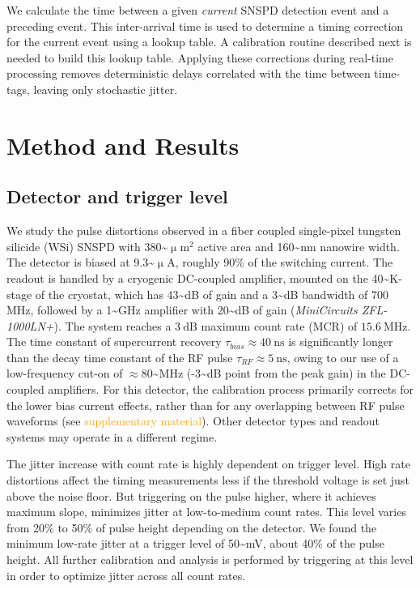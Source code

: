 \documentclass[11pt]{caltech_thesis} %
\begin{document}
We calculate the time between a given \emph{current} SNSPD detection
event and a preceding event. This inter-arrival time is used to
determine a timing correction for the current event using a lookup
table. A calibration routine described next is needed to build this
lookup table. Applying these corrections during real-time processing
removes deterministic delays correlated with the time between time-tags,
leaving only stochastic jitter.

\hypertarget{method-and-results}{%
\section{Method and Results}\label{method-and-results}}

\hypertarget{detector-and-trigger-level}{%
\subsection{Detector and trigger
level}\label{detector-and-trigger-level}}

We study the pulse distortions observed in a fiber coupled single-pixel
tungsten silicide (WSi) SNSPD with
380\textasciitilde{}$\mathrm{\upmu m^2}$ active area and
160\textasciitilde nm nanowire width. The detector is biased at
9.3\textasciitilde{}$\mathrm{\upmu A}$, roughly 90\% of the switching
current. The readout is handled by a cryogenic DC-coupled amplifier,
mounted on the 40\textasciitilde K-stage of the cryostat, which has
43\textasciitilde dB of gain and a 3\textasciitilde dB bandwidth of 700
MHz, followed by a 1\textasciitilde GHz amplifier with
20\textasciitilde dB of gain (\emph{MiniCircuits ZFL-1000LN+}). The
system reaches a $3~\mathrm{dB}$ maximum count rate (MCR) of
$15.6~\mathrm{MHz}$. The time constant of supercurrent recovery
$\tau_{bias} \approx 40~\mathrm{ns}$ is significantly longer than the
decay time constant of the RF pulse $\tau_{RF} \approx 5~\mathrm{ns}$,
owing to our use of a low-frequency cut-on of
$\approx 80$\textasciitilde MHz (-3\textasciitilde dB point from the
peak gain) in the DC-coupled amplifiers. For this detector, the
calibration process primarily corrects for the lower bias current
effects, rather than for any overlapping between RF pulse waveforms (see
\textcolor{orange}{supplementary material}). Other detector types and
readout systems may operate in a different regime.

The jitter increase with count rate is highly dependent on trigger
level. High rate distortions affect the timing measurements less if the
threshold voltage is set just above the noise floor. But triggering on
the pulse higher, where it achieves maximum slope, minimizes jitter at
low-to-medium count rates. This level varies from 20\% to 50\% of pulse
height depending on the detector. We found the minimum low-rate jitter
at a trigger level of 50\textasciitilde mV, about 40\% of the pulse
height. All further calibration and analysis is performed by triggering
at this level in order to optimize jitter across all count rates.
\end{document}
